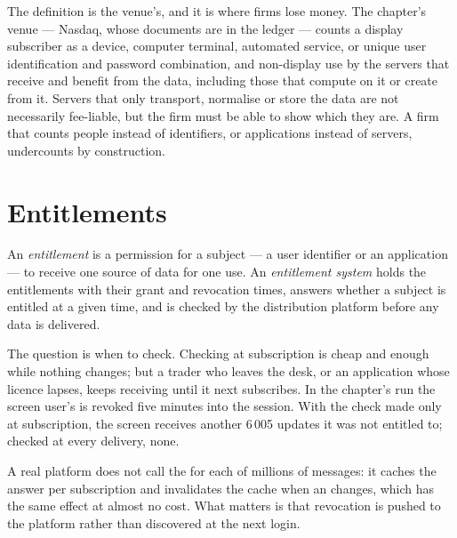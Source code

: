 The definition is the venue's, and it is where firms lose money. The chapter's venue --- Nasdaq, whose documents are in the ledger --- counts a
display subscriber as \textquotedbl{}a device, computer terminal, automated service, or unique user identification and password
combination\textquotedbl{}, and non-display use by the servers that receive and benefit from the data, including those that compute on it or
create  from it. Servers that only transport, normalise or store the data are not necessarily fee-liable, but the firm must be able
to show which they are. A firm that counts people instead of identifiers, or applications instead of servers, undercounts by construction.

\section{Entitlements}

\begin{definition}\label{def:pl:market-data-distribution-and-entitlements:entitlement}
An \emph{entitlement} is a permission for a subject --- a user identifier or an application --- to receive one source of
data for one use. An \emph{entitlement system} holds the entitlements with their grant and revocation times,
answers whether a subject is entitled at a given time, and is checked by the distribution platform before any data is delivered.
\end{definition}

The question is when to check. Checking at subscription is cheap and enough while nothing changes; but a trader who leaves the desk, or an
application whose licence lapses, keeps receiving until it next subscribes. In the chapter's run the screen user's  is revoked five
minutes into the session. With the check made only at subscription, the screen receives another 6\,005 updates it was not entitled to; checked
at every delivery, none.

\label{lst:pl:market-data-distribution-and-entitlements:serve}

A real platform does not call the  for each of millions of messages: it caches the answer per subscription and invalidates the
cache when an  changes, which has the same effect at almost no cost. What matters is that revocation is pushed to the platform
rather than discovered at the next login.

